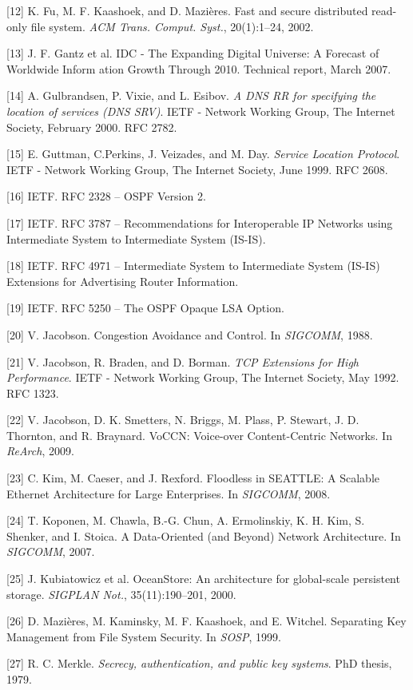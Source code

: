 [12] K. Fu, M. F. Kaashoek, and D. Mazières. Fast and secure distributed read-only file system. \emph{ACM Trans. Comput. Syst.}, 20(1):1–24, 2002.

[13] J. F. Gantz et al. IDC - The Expanding Digital Universe: A Forecast of Worldwide Inform ation Growth Through 2010. Technical report, March 2007.

[14] A. Gulbrandsen, P. Vixie, and L. Esibov. \emph{A DNS RR for specifying the location of services (DNS SRV)}. IETF - Network Working Group, The Internet Society, February 2000. RFC 2782.

[15] E. Guttman, C.Perkins, J. Veizades, and M. Day. \emph{Service Location Protocol}. IETF - Network Working Group, The Internet Society, June 1999. RFC 2608.

[16] IETF. RFC 2328 – OSPF Version 2.

[17] IETF. RFC 3787 – Recommendations for Interoperable IP
Networks using Intermediate System to Intermediate System (IS-IS).

[18] IETF. RFC 4971 – Intermediate System to Intermediate System (IS-IS) Extensions for Advertising Router Information.

[19] IETF. RFC 5250 – The OSPF Opaque LSA Option.

[20] V. Jacobson. Congestion Avoidance and Control. In
\emph{SIGCOMM}, 1988.

[21] V. Jacobson, R. Braden, and D. Borman. \emph{TCP Extensions for
High Performance}. IETF - Network Working Group, The
Internet Society, May 1992. RFC 1323.

[22] V. Jacobson, D. K. Smetters, N. Briggs, M. Plass, P. Stewart,
J. D. Thornton, and R. Braynard. VoCCN: Voice-over
Content-Centric Networks. In \emph{ReArch}, 2009.

[23] C. Kim, M. Caeser, and J. Rexford. Floodless in SEATTLE:
A Scalable Ethernet Architecture for Large Enterprises. In
\emph{SIGCOMM}, 2008.

[24] T. Koponen, M. Chawla, B.-G. Chun, A. Ermolinskiy, K. H.
Kim, S. Shenker, and I. Stoica. A Data-Oriented (and
Beyond) Network Architecture. In \emph{SIGCOMM}, 2007.

[25] J. Kubiatowicz et al. OceanStore: An architecture for
global-scale persistent storage. \emph{SIGPLAN Not.},
35(11):190–201, 2000.

[26] D. Mazières, M. Kaminsky, M. F. Kaashoek, and E. Witchel.
Separating Key Management from File System Security. In
\emph{SOSP}, 1999.

[27] R. C. Merkle. \emph{Secrecy, authentication, and public key
systems}. PhD thesis, 1979.

